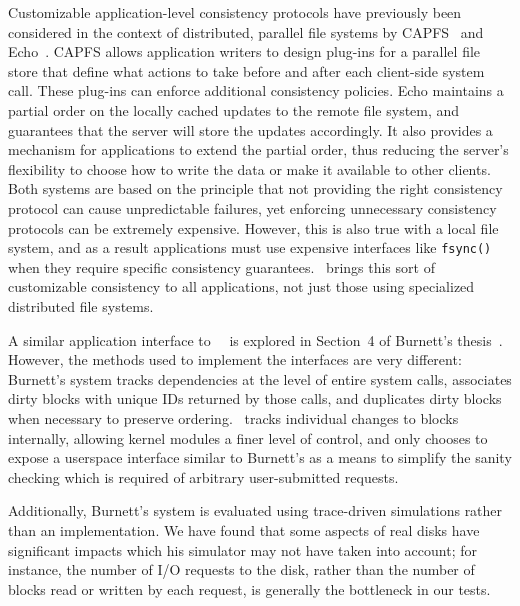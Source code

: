 Customizable application-level consistency protocols have previously been
considered in the context of distributed, parallel file systems by
CAPFS~\cite{vilayannur05providing} and Echo~\cite{mann94coherent}.
%
CAPFS allows application writers to design plug-ins for a parallel file store
that define what actions to take before and after each client-side system
call.
%
These plug-ins can enforce additional consistency policies.
%
Echo maintains a partial order on the locally cached updates to the remote file
system, and guarantees that the server will store the updates accordingly. It
also provides a mechanism for applications to extend the partial order, thus
reducing the server's flexibility to choose how to write the data or make it
available to other clients.
%
Both systems are based on the principle that not providing the right
consistency protocol can cause unpredictable failures, yet enforcing
unnecessary consistency protocols can be extremely expensive.
%
However, this is also true with a local file system, and as a result
applications must use expensive interfaces like \texttt{fsync()} when they
require specific consistency guarantees.
%
\Kudos\ brings this sort of customizable consistency to all applications, not
just those using specialized distributed file systems.

A similar application interface to \Kudos\ \patchgroups\ is explored in
Section~4 of Burnett's thesis~\cite{burnett06information}. However, the methods
used to implement the interfaces are very different: Burnett's system tracks
dependencies at the level of entire system calls, associates dirty blocks with
unique IDs returned by those calls, and duplicates dirty blocks when necessary
to preserve ordering. \Kudos\ tracks individual changes to blocks internally,
allowing kernel modules a finer level of control, and only chooses to expose a
userspace interface similar to Burnett's as a means to simplify the sanity
checking which is required of arbitrary user-submitted requests.

Additionally, Burnett's system is evaluated using trace-driven simulations
rather than an implementation. We have found that some aspects of real disks
have significant impacts which his simulator may not have taken into account;
for instance, the number of I/O requests to the disk, rather than the number of
blocks read or written by each request, is generally the bottleneck in our
tests.


